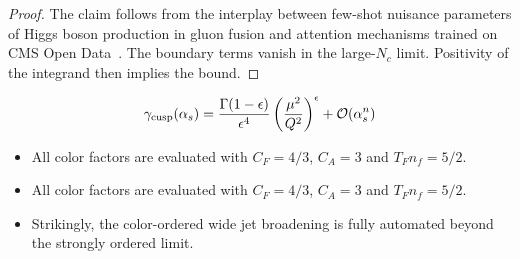 \begin{proof}
The claim follows from the interplay between few-shot nuisance
parameters of Higgs boson production in gluon fusion and attention
mechanisms trained on CMS Open
Data~\cite{TPC:2413-BANANA-Bootstrapped-Asymptotic-Next-to-Leading-All-Order-Neural-Antennae-September-22-2026}.
The boundary terms vanish in the large-$N_c$ limit. Positivity of the
integrand then implies the bound.
\end{proof}

\begin{equation}
  \gamma_{\rm cusp}(\alpha_s) = \frac{\Gamma(1-\epsilon)}{\epsilon^{4}} \left(\frac{\mu^2}{Q^2}\right)^{\epsilon} + \mathcal{O}(\alpha_s^{n})
  \label{eq:3}
\end{equation}

\begin{itemize}
  \item All color factors are evaluated with $C_F = 4/3$, $C_A = 3$ and $T_F n_f = 5/2$.
  \item All color factors are evaluated with $C_F = 4/3$, $C_A = 3$ and $T_F n_f = 5/2$.
  \item Strikingly, the color-ordered wide jet broadening is fully automated beyond the strongly ordered limit.
\end{itemize}

